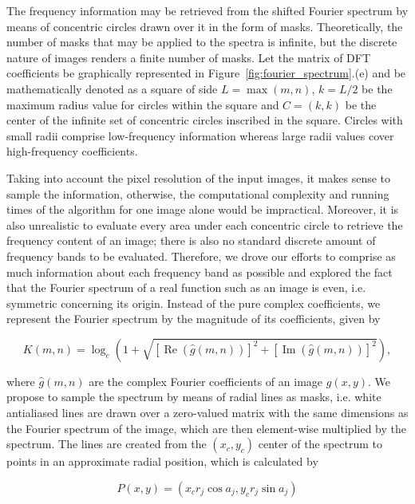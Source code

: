 The frequency information may be retrieved from the shifted Fourier spectrum by means of concentric circles drawn over it in the form of masks. Theoretically, the number of masks that may be applied to the spectra is infinite, but the discrete nature of images renders a finite number of masks. Let the matrix of DFT coefficients be graphically represented in Figure~\ref{fig:fourier_spectrum}.(e) and be mathematically denoted as a square of side $L = \max{(m,n)}$, $k = L / 2$ be the maximum radius value for circles within the square and $C = (k,k)$ be the center of the infinite set of concentric circles inscribed in the square. Circles with small radii comprise low-frequency information whereas large radii values cover high-frequency coefficients.

Taking into account the pixel resolution of the input images, it makes sense to sample the information, otherwise, the computational complexity and running times of the algorithm for one image alone would be impractical. Moreover, it is also unrealistic to evaluate every area under each concentric circle to retrieve the frequency content of an image; there is also no standard discrete amount of frequency bands to be evaluated. Therefore, we drove our efforts to comprise as much information about each frequency band as possible and explored the fact that the Fourier spectrum of a real function such as an image is even, i.e. symmetric concerning its origin. Instead of the pure complex coefficients, we represent the Fourier spectrum by the magnitude of its coefficients, given by

\begin{equation}
\label{eqn:magnitude_of_DFT}
K(m,n) = 
    \log_{e}{\left(1
    + \sqrt{
        [\operatorname{Re}{(\hat{g}(m,n))}]^{2}
        + [\operatorname{Im}{(\hat{g}(m,n))}]^{2}
      }
    \right)},
\end{equation}

\noindent where $\hat{g}(m,n)$ are the complex Fourier coefficients of an image $g(x,y)$. We propose to sample the spectrum by means of radial lines as masks, i.e. white antialiased lines are drawn over a zero-valued matrix with the same dimensions as the Fourier spectrum of the image, which are then element-wise multiplied by the spectrum. The lines are created from the $(x_{c},y_{c})$ center of the spectrum to points in an approximate radial position, which is calculated by

\begin{equation}
\label{eqn:points_on_radii}
P(x,y) = 
    (
    x_{c} r_{j} \cos{a_{j}}, 
    y_{c} r_{j} \sin{a_{j}}
    )
\end{equation}

